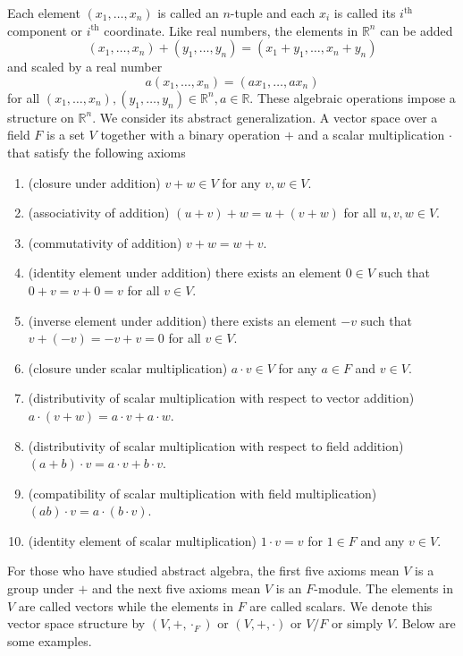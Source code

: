\documentclass[12pt]{amsart}
\theoremstyle{definition}
\begin{document}
Each element $(x_1, \dots , x_n)$ is called an $n$-tuple and each $x_i$ is called its $i^{\text{th}}$ component or $i^{\text{th}}$ coordinate. Like real numbers, the elements in $\mathbb{R}^n$ can be added
$$(x_1, \dots , x_n) + (y_1, \dots , y_n) = (x_1 + y_1, \dots , x_n + y_n)$$
and scaled by a real number
$$a (x_1, \dots , x_n) = (a x_1, \dots , a x_n)$$
for all $(x_1, \dots , x_n), (y_1, \dots , y_n) \in \mathbb{R}^n, a \in \mathbb{R}$. These algebraic operations impose a structure on $\mathbb{R}^n$. We consider its abstract generalization.
\dfn A vector space over a field $F$ is a set $V$ together with a binary operation $+$ and a scalar multiplication $\cdot$ that satisfy the following axioms
\begin{enumerate}[\indent 1.]
\item (closure under addition) $v + w \in V$ for any $v, w \in V$.
\item (associativity of addition) $(u + v) + w = u + (v + w)$ for all $u, v, w \in V$.
\item (commutativity of addition) $v + w = w + v$.
\item (identity element under addition) there exists an element $0 \in V$ such that $0 + v = v + 0 = v$ for all $v \in V$.
\item (inverse element under addition) there exists an element $-v$ such that $v + (-v) = -v + v = 0$ for all $v \in V$.
\item (closure under scalar multiplication) $a \cdot v \in V$ for any $a \in F$ and $v \in V$.
\item (distributivity of scalar multiplication with respect to vector addition) $a \cdot (v + w) = a \cdot v + a \cdot w$.
\item (distributivity of scalar multiplication with respect to field addition) $(a + b) \cdot v = a \cdot v + b \cdot v$.
\item (compatibility of scalar multiplication with field multiplication) $(a b) \cdot v = a \cdot (b \cdot v)$.
\item (identity element of scalar multiplication) $1 \cdot v = v$ for $1 \in F$ and any $v \in V$.
\end{enumerate}

For those who have studied abstract algebra, the first five axioms mean $V$ is a group under $+$ and the next five axioms mean $V$ is an $F$-module. The elements in $V$ are called vectors while the elements in $F$ are called scalars. We denote this vector space structure by $(V, + , \cdot_F)$ or $(V, + , \cdot)$ or $V/F$ or simply $V$. Below are some examples.
\end{document}
